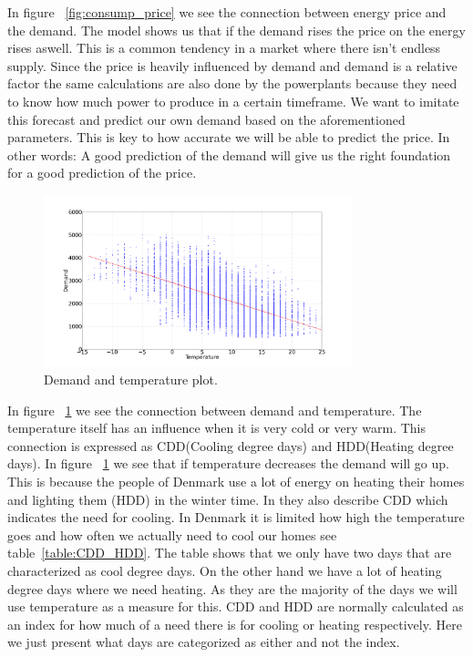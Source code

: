 In figure ~\ref{fig:consump_price} we see the connection between energy price and the demand. The model shows us that if the demand rises the price on the energy rises aswell. This is a common tendency in a market where there isn't endless supply. Since the price is heavily influenced by demand and demand is a relative factor the same calculations are also done by the powerplants because they need to know how much power to produce in a certain timeframe. We want to imitate this forecast and predict our own demand based on the aforementioned parameters. This is key to how accurate we will be able to predict the price. In other words: A good prediction of the demand will give us the right foundation for a good prediction of the price.

\begin{figure}[H]
\centering
\includegraphics[width=0.8\textwidth ]{billeder/energy_price_plots/consump_temp.png}
\caption{Demand and temperature plot.}
\label{fig:consump_temp}
\end{figure}


In figure ~\ref{fig:consump_temp} we see the connection between demand and temperature. The temperature itself has an influence when it is very cold or very warm. This connection is expressed as CDD(Cooling degree days) and HDD(Heating degree days). In figure ~\ref{fig:consump_temp} we see that if temperature decreases the demand will go up. This is because the people of Denmark use a lot of energy on heating their homes and lighting them (HDD) in the winter time. In \cite{19} they also describe CDD which indicates the need for cooling. In Denmark it is limited how high the temperature goes and how often we actually need to cool our homes see table~\ref{table:CDD_HDD}. The table shows that we only have two days that are characterized as cool degree days. On the other hand we have a lot of heating degree days where we need heating. As they are the majority of the days we will use temperature as a measure for this. CDD and HDD are normally calculated as an index for how much of a need there is for cooling or heating respectively. Here we just present what days are categorized as either and not the index.

